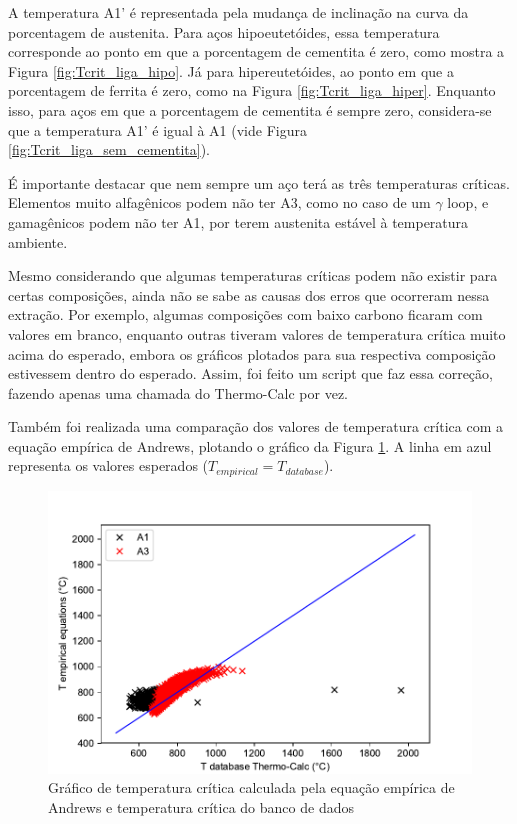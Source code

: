 \documentclass[brazil,tf,epusp]{usp}  %
\begin{document}
A temperatura A1' é representada pela mudança de inclinação na curva da porcentagem de austenita. Para aços hipoeutetóides, essa temperatura corresponde ao ponto em que a porcentagem de cementita é zero, como mostra a Figura \ref{fig:Tcrit_liga_hipo}. Já para hipereutetóides, ao ponto em que a porcentagem de ferrita é zero, como na Figura \ref{fig:Tcrit_liga_hiper}. Enquanto isso, para aços em que a porcentagem de cementita é sempre zero, considera-se que a temperatura A1' é igual à A1 (vide Figura \ref{fig:Tcrit_liga_sem_cementita}).

É importante destacar que nem sempre um aço terá as três temperaturas críticas. Elementos muito alfagênicos podem não ter A3, como no caso de um $\gamma$ loop, e gamagênicos podem não ter A1, por terem austenita estável à temperatura ambiente.

Mesmo considerando que algumas temperaturas críticas podem não existir para certas composições, ainda não se sabe as causas dos erros que ocorreram nessa extração. Por exemplo, algumas composições com baixo carbono ficaram com valores em branco, enquanto outras tiveram valores de temperatura crítica muito acima do esperado, embora os gráficos plotados para sua respectiva composição estivessem dentro do esperado. Assim, foi feito um script que faz essa correção, fazendo apenas uma chamada do Thermo-Calc\textregistered{} por vez.

Também foi realizada uma comparação dos valores de temperatura crítica com a equação empírica de Andrews, plotando o gráfico da Figura \ref{fig:tcrit_andrews}. A linha em azul representa os valores esperados ($T_{empirical} = T_{database}$).

\begin{figure}
  \includegraphics[width=1.1\textwidth]{img/andrews.pdf}
  \caption{Gráfico de temperatura crítica calculada pela equação empírica de Andrews e temperatura crítica do banco de dados}
  \label{fig:tcrit_andrews}
\end{figure}
\end{document}
